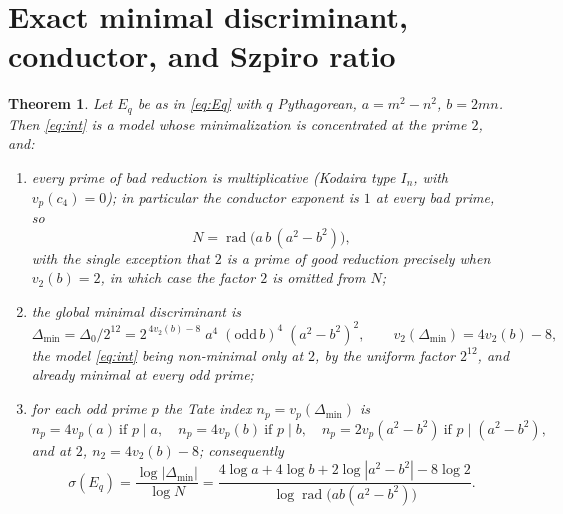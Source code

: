 \documentclass[11pt,reqno]{amsart}
\theoremstyle{plain}
\newtheorem{theorem}{Theorem}[section]
\theoremstyle{definition}
\newcommand{\rad}{\operatorname{rad}}
\begin{document}
\section{Exact minimal discriminant, conductor, and Szpiro ratio}

\begin{theorem}\label{thm:main}
Let $E_q$ be as in \eqref{eq:Eq} with $q$ Pythagorean, $a=m^2-n^2$, $b=2mn$. Then
\eqref{eq:int} is a model whose minimalization is concentrated at the prime $2$,
and:
\begin{enumerate}
\item[\textup{(i)}] every prime of bad reduction is multiplicative \textup{(}Kodaira
type $I_n$, with $v_p(c_4)=0$\textup{)}; in particular the conductor exponent is
$1$ at every bad prime, so
\[
  N=\rad\bigl(a\,b\,(a^2-b^2)\bigr),
\]
with the single exception that $2$ is a prime of good reduction precisely when
$v_2(b)=2$, in which case the factor $2$ is omitted from $N$;
\item[\textup{(ii)}] the global minimal discriminant is
\[
  \Delta_{\min}=\Delta_0/2^{12}
  =2^{\,4v_2(b)-8}\;a^4\;(\mathrm{odd}\,b)^4\;(a^2-b^2)^2,
  \qquad v_2(\Delta_{\min})=4v_2(b)-8,
\]
the model \eqref{eq:int} being non-minimal only at $2$, by the uniform factor
$2^{12}$, and already minimal at every odd prime;
\item[\textup{(iii)}] for each odd prime $p$ the Tate index $n_p=v_p(\Delta_{\min})$
is
\[
  n_p=4v_p(a)\ \text{if }p\mid a,\quad
  n_p=4v_p(b)\ \text{if }p\mid b,\quad
  n_p=2v_p(a^2-b^2)\ \text{if }p\mid (a^2-b^2),
\]
and at $2$, $n_2=4v_2(b)-8$; consequently
\begin{equation}\label{eq:sigma}
  \sigma(E_q)=\frac{\log|\Delta_{\min}|}{\log N}
  =\frac{4\log a+4\log b+2\log|a^2-b^2|-8\log2}
        {\log\rad\bigl(ab(a^2-b^2)\bigr)}.
\end{equation}
\end{enumerate}
\end{theorem}
\end{document}

